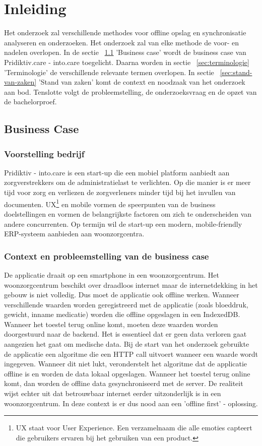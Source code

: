 \chapter{Inleiding}
\label{ch:inleiding}
Het onderzoek zal verschillende methodes voor offline opslag en synchronisatie analyseren en onderzoeken. Het onderzoek zal van elke methode de voor- en nadelen overlopen. In de sectie ~\ref{sec:business-case} 'Business case' wordt de business case van Pridiktiv.care - into.care toegelicht. Daarna worden in sectie ~\ref{sec:terminologie} 'Terminologie' de verschillende relevante termen overlopen. In sectie ~\ref{sec:stand-van-zaken} 'Stand van zaken' komt de context en noodzaak van het onderzoek aan bod. Tenslotte volgt de probleemstelling, de onderzoeksvraag en de opzet van de bachelorproef.
\section{Business Case}
\label{sec:business-case}
\subsection{Voorstelling bedrijf}
Pridiktiv - into.care is een start-up die een mobiel platform aanbiedt aan zorgverstrekkers om de administratielast te verlichten. Op die manier is er meer tijd voor zorg en verliezen de zorgverleners minder tijd bij het invullen van documenten. UX\footnote{UX staat voor User Experience. Een verzamelnaam die alle emoties capteert die gebruikers ervaren bij het gebruiken van een product.} en mobile vormen de speerpunten van de business doelstellingen en vormen de belangrijkste factoren om zich te onderscheiden van andere concurrenten. Op termijn wil de start-up een modern, mobile-friendly ERP-systeem aanbieden aan woonzorgcentra.
\subsection{Context en probleemstelling van de business case}
De applicatie draait op een smartphone in een woonzorgcentrum. Het woonzorgcentrum beschikt over draadloos internet maar de internetdekking in het gebouw is niet volledig. Dus moet de applicatie ook offline werken. Wanneer verschillende waarden worden geregistreerd met de applicatie (zoals bloeddruk, gewicht, inname medicatie) worden die offline opgeslagen in een IndexedDB. Wanneer het toestel terug online komt, moeten deze waarden worden doorgestuurd naar de backend. Het is essentieel dat er geen data verloren gaat aangezien het gaat om medische data. Bij de start van het onderzoek gebruikte de applicatie een algoritme die een HTTP call uitvoert wanneer een waarde wordt ingegeven. Wanneer dit niet lukt, veronderstelt het algoritme dat de applicatie offline is en worden de data lokaal opgeslagen. Wanneer het toestel terug online komt, dan worden de offline data gesynchroniseerd met de server. De realiteit wijst echter uit dat betrouwbaar internet eerder uitzonderlijk is in een woonzorgcentrum. In deze context is er dus nood aan een 'offline first' -  oplossing.
